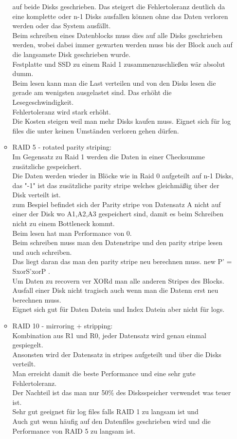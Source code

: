 \documentclass[12pt]{article}\pagestyle{myheadings}
\theoremstyle{plain}
\begin{document}
\begin{enumerate}
\begin{itemize}
auf beide Disks geschrieben. Das steigert die Fehlertoleranz deutlich da eine komplette oder n-1 Disks ausfallen können ohne das Daten verloren werden oder das System ausfällt. \\
Beim schreiben eines Datenblocks muss dies auf alle Disks geschrieben werden, wobei dabei immer gewarten werden muss bis der Block auch auf die langsamste Disk geschrieben wurde.\\
Festplatte und SSD zu einem Raid 1 zusammenzuschließen wär absolut dumm.\\
Beim lesen kann man die Last verteilen und von den Disks lesen die gerade am wenigsten ausgelastet sind. Das erhöht die Lesegeschwindigkeit.\\
Fehlertoleranz wird stark erhöht.\\
Die Kosten steigen weil man mehr Disks kaufen muss.
Eignet sich für log files die unter keinen Umständen verloren gehen dürfen.\\
\item RAID 5 - rotated parity striping:\\
Im Gegensatz zu Raid 1 werden die Daten in einer Checksumme zusätzliche gespeichert.\\
Die Daten werden wieder in Blöcke wie in Raid 0 aufgeteilt auf n-1 Disks, das "-1" ist das zusätzliche parity stripe welches gleichmäßig über der Disk verteilt ist.\\
zum Bespiel befindet sich der Parity stripe von Datensatz A nicht auf einer der Disk wo A1,A2,A3 gespeichert sind, damit es beim Schreiben nicht zu einem Bottleneck kommt.\\
Beim lesen hat man Performance von 0.\\
Beim schreiben muss man den Datenstripe und den parity stripe lesen und auch schreiben.\\
Das liegt daran das man den parity stripe neu berechnen muss. new P' = SxorS'xorP .\\
Um Daten zu recovern ver XORd man alle anderen Stripes des Blocks.\\
Ausfall einer Disk nicht tragisch auch wenn man die Datenn erst neu berechnen muss.\\
Eignet sich gut für Daten Datein und Index Datein aber nicht für logs.\\
\item RAID 10 - mirroring + stripping:\\
Kombination aus R1 und R0, jeder Datensatz wird genau einmal gespiegelt.\\Ansonsten wird der Datensatz in stripes aufgeteilt und über die Disks verteilt.\\
Man erreicht damit die beste Performance und eine sehr gute Fehlertoleranz.\\
Der Nachteil ist das man nur 50\% des Disksspeicher verwendet was teuer ist.\\
Sehr gut geeignet für log files falls RAID 1 zu langsam ist und \\
Auch gut wenn häufig auf den Datenfiles geschrieben wird und die Performance von RAID 5 zu langsam ist. 


\end{itemize}
\end{enumerate}
\end{document}
